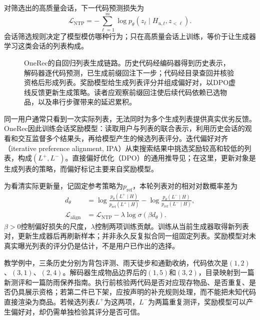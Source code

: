 对筛选出的高质量会话，下一代码预测损失为
\begin{equation}
 \mathcal L_{\mathrm{NTP}}
 =-\sum_{\ell=1}^{m}\log
   p_\theta(z_\ell\mid H_{u,t},z_{<\ell}).
 \label{eq:rs-onerec-ntp}
\end{equation}
会话筛选规则决定了模型模仿哪种行为；只在高质量会话上训练，等价于让生成器学习这类会话的列表构成。

\begin{figure}[htbp]
 \centering
 
 \caption{OneRec的自回归列表生成链路。历史代码经编码器得到历史表示，解码器逐代码预测，已生成前缀回注下一步；代码经目录查回并核验资格后形成列表。奖励模型给生成列表评分并组成偏好对，以DPO虚线反馈更新生成策略。读者应观察前缀回注使后续代码依赖已选物品，以及串行步骤带来的延迟累积。}
 \label{fig:rs-onerec-decode}
\end{figure}

同一用户通常只看到一次实际列表，无法同时为多个生成列表提供真实优劣反馈。OneRec因此训练会话奖励模型：读取用户与列表的联合表示，利用历史会话的观看和交互监督多个结果头，再给模型产生的候选列表评分。迭代偏好对齐（iterative preference alignment, IPA）从束搜索结果中挑选奖励较高和较低的列表，构成$(L^+,L^-)$。直接偏好优化（DPO）的通用推导见；在这里，更新对象是生成列表的策略，而偏好标记主要来自奖励模型。

为看清实际更新量，记固定参考策略为$p_{\mathrm{ref}}$，本轮列表对的相对对数概率差为
\begin{align}
 d_\theta&=
 \log\frac{p_\theta(L^+\mid H)}{p_{\mathrm{ref}}(L^+\mid H)}
 -\log\frac{p_\theta(L^-\mid H)}{p_{\mathrm{ref}}(L^-\mid H)},\\
 \mathcal L_{\mathrm{align}}
 &=\mathcal L_{\mathrm{NTP}}
   -\lambda\log\sigma(\beta d_\theta).
 \label{eq:rs-onerec-dpo}
\end{align}
$\beta>0$控制偏好损失的尺度，$\lambda$控制两项训练贡献。训练从当前生成器取得新列表对，更新生成器后再刷新样本；并非永久反复拟合同一组固定列表。奖励模型对未真实曝光列表的评分仍是估计，不是用户已作出的选择。

教学例中，三条历史分别为背包评测、雨天徒步和通勤收纳，代码依次是$(1,2)$、$(3,1)$、$(2,4)$。解码器生成物品边界后的$(1,5)$和$(3,2)$，目录映射到一篇新测评和一篇防雨保养指南。执行前核验两代码是否对应现存物品、是否重复、是否仍具展示资格；若第二件已下架，应按声明的补充规则处理，而不能把未知代码直接渲染为商品。若候选列表$L^+$为这两项，$L^-$为两篇重复测评，奖励模型可以产生偏好对，却仍需单独检验其评分是否可信。

